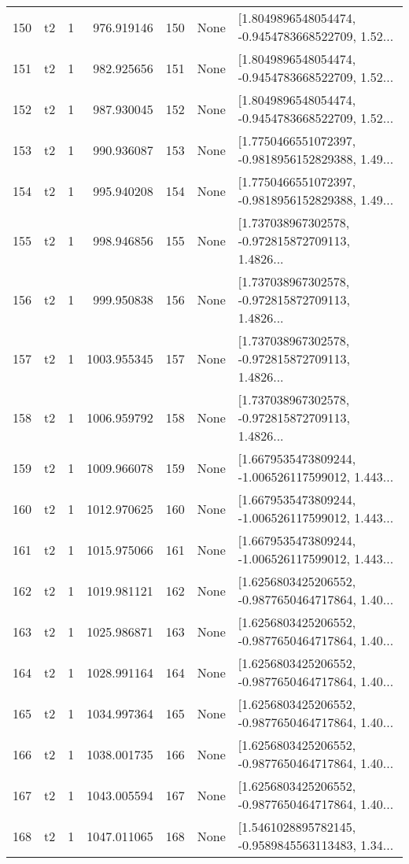 \begin{tabular}{lllrlll}
150 &  t2 &   1 &   976.919146 &  150 &  None &  [1.8049896548054474, -0.9454783668522709, 1.52... \\
151 &  t2 &   1 &   982.925656 &  151 &  None &  [1.8049896548054474, -0.9454783668522709, 1.52... \\
152 &  t2 &   1 &   987.930045 &  152 &  None &  [1.8049896548054474, -0.9454783668522709, 1.52... \\
153 &  t2 &   1 &   990.936087 &  153 &  None &  [1.7750466551072397, -0.9818956152829388, 1.49... \\
154 &  t2 &   1 &   995.940208 &  154 &  None &  [1.7750466551072397, -0.9818956152829388, 1.49... \\
155 &  t2 &   1 &   998.946856 &  155 &  None &  [1.737038967302578, -0.972815872709113, 1.4826... \\
156 &  t2 &   1 &   999.950838 &  156 &  None &  [1.737038967302578, -0.972815872709113, 1.4826... \\
157 &  t2 &   1 &  1003.955345 &  157 &  None &  [1.737038967302578, -0.972815872709113, 1.4826... \\
158 &  t2 &   1 &  1006.959792 &  158 &  None &  [1.737038967302578, -0.972815872709113, 1.4826... \\
159 &  t2 &   1 &  1009.966078 &  159 &  None &  [1.6679535473809244, -1.006526117599012, 1.443... \\
160 &  t2 &   1 &  1012.970625 &  160 &  None &  [1.6679535473809244, -1.006526117599012, 1.443... \\
161 &  t2 &   1 &  1015.975066 &  161 &  None &  [1.6679535473809244, -1.006526117599012, 1.443... \\
162 &  t2 &   1 &  1019.981121 &  162 &  None &  [1.6256803425206552, -0.9877650464717864, 1.40... \\
163 &  t2 &   1 &  1025.986871 &  163 &  None &  [1.6256803425206552, -0.9877650464717864, 1.40... \\
164 &  t2 &   1 &  1028.991164 &  164 &  None &  [1.6256803425206552, -0.9877650464717864, 1.40... \\
165 &  t2 &   1 &  1034.997364 &  165 &  None &  [1.6256803425206552, -0.9877650464717864, 1.40... \\
166 &  t2 &   1 &  1038.001735 &  166 &  None &  [1.6256803425206552, -0.9877650464717864, 1.40... \\
167 &  t2 &   1 &  1043.005594 &  167 &  None &  [1.6256803425206552, -0.9877650464717864, 1.40... \\
168 &  t2 &   1 &  1047.011065 &  168 &  None &  [1.5461028895782145, -0.9589845563113483, 1.34... \\

\end{tabular}
